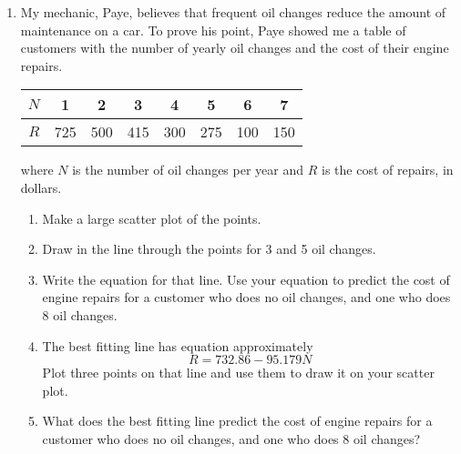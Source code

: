 \begin{enumerate}
\item My mechanic, Paye, believes that frequent oil changes reduce the amount of maintenance on a car.  To prove his point, Paye showed me a table of customers with the number of yearly oil changes and the cost of their engine repairs. 
\begin{center} 
\begin{tabular} {|c||c|c |c|c|c|c|c|}  \hline
$N$& 1 & 2 & 3 & 4 & 5 & 6 & 7  \\ \hline
$R$& 725 & 500 & 415 & 300 & 275 & 100 & 150  \\ \hline
\end{tabular}
\end{center}
where $N$ is the number of oil changes per year and $R$ is the cost of repairs, in dollars.
\begin{enumerate}
\item Make a large scatter plot of the points. 
\item Draw in the line through the points for 3 and 5 oil changes.  
\item Write the equation for that line.  Use your equation to predict the cost of engine repairs for a customer who does no oil changes, and one who does 8 oil changes.
\item The best fitting line has equation approximately $$R=732.86-95.179N$$
Plot three points on that line and use them to draw it on your scatter plot.
\item What does the best fitting line predict the cost of engine repairs for a customer who does no oil changes, and one who does 8 oil changes?
\end{enumerate}  %


\end{enumerate}
